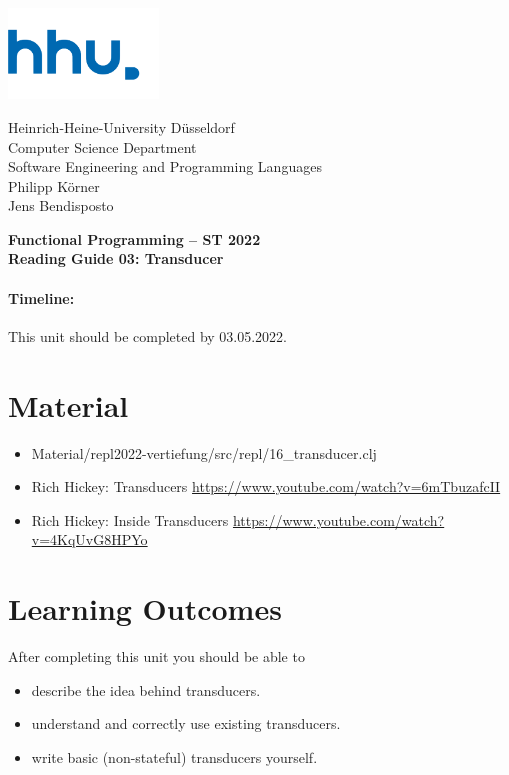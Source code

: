 \documentclass[11pt,a4paper]{article}
\begin{document}
\begin{minipage}[b]{\textwidth}
	\parbox[t]{5cm}{%
		\includegraphics[width=4cm]{unilogo}
		\hfill
	}
	\parbox[b]{11cm}{%
		Heinrich-Heine-University D\"usseldorf\\
		Computer Science Department\\
		Software Engineering and Programming Languages\\
		Philipp K\"orner \\
        Jens Bendisposto
	}
\end{minipage}
\begin{center}
	\bf
	Functional Programming -- ST 2022 \\
	Reading Guide 03: Transducer
\end{center}

\pagestyle{empty}

\paragraph{Timeline:} This unit should be completed by 03.05.2022.

\section{Material} 

\begin{itemize}
    \item Material/repl2022-vertiefung/src/repl/16\_transducer.clj
    \item Rich Hickey: Transducers \url{https://www.youtube.com/watch?v=6mTbuzafcII}
    \item Rich Hickey: Inside Transducers \url{https://www.youtube.com/watch?v=4KqUvG8HPYo}
\end{itemize}


\section{Learning Outcomes}

After completing this unit you should be able to

\begin{itemize}
    \item describe the idea behind transducers.
    \item understand and correctly use existing transducers.
    \item write basic (non-stateful) transducers yourself.
\end{itemize}
\end{document}
